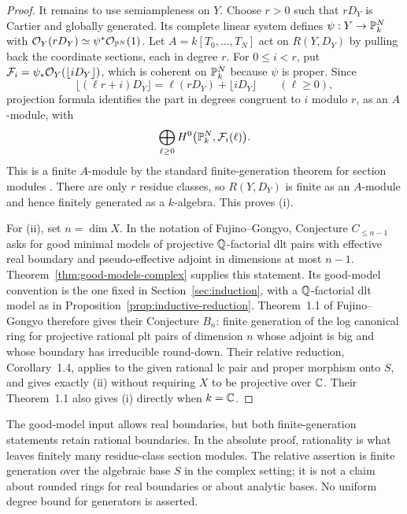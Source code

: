 \begin{proof}
It remains to use semiampleness on \(Y\). Choose \(r>0\) such that
\(rD_Y\) is Cartier and globally generated. Its complete linear system
defines \(\psi:Y\to\mathbb{P}^N_k\) with
\(\mathcal{O}_Y(rD_Y)\simeq\psi^*\mathcal{O}_{\mathbb{P}^N}(1)\). Let
\(A=k[T_0,\ldots,T_N]\) act on \(R(Y,D_Y)\) by pulling back the coordinate
sections, each in degree \(r\). For \(0\leq i<r\), put
\(\mathcal F_i=\psi_*\mathcal{O}_Y(\lfloor iD_Y\rfloor)\), which is coherent on
\(\mathbb{P}^N_k\) because \(\psi\) is proper. Since
\[
 \lfloor(\ell r+i)D_Y\rfloor
 =\ell(rD_Y)+\lfloor iD_Y\rfloor\qquad(\ell\geq0),
\]
projection formula identifies the part in degrees congruent to \(i\)
modulo \(r\), as an \(A\)-module, with
\[
 \bigoplus_{\ell\geq0}H^0\bigl(\mathbb{P}^N_k,\mathcal F_i(\ell)\bigr).
\]
This is a finite \(A\)-module by the standard finite-generation theorem
for section modules \cite[Lemma~30.14.1(5)]{StacksSectionModules}.
There are only \(r\) residue classes, so \(R(Y,D_Y)\) is finite as an
\(A\)-module and hence finitely generated as a \(k\)-algebra. This proves
\textup{(i)}.

For \textup{(ii)}, set \(n=\dim X\). In the notation of Fujino--Gongyo,
Conjecture \(C_{\leq n-1}\) asks for good minimal models of projective
\(\mathbb{Q}\)-factorial dlt pairs with effective real boundary and pseudo-effective
adjoint in dimensions at most \(n-1\). Theorem~\ref{thm:good-models-complex}
supplies this statement. Its good-model convention is the one fixed in
Section~\ref{sec:induction}, with a \(\mathbb{Q}\)-factorial dlt model as in
Proposition~\ref{prop:inductive-reduction}. Theorem~1.1 of
Fujino--Gongyo \cite{FujinoGongyoRings2014} therefore gives their
Conjecture \(B_n\): finite generation of the log canonical ring for
projective rational plt pairs of dimension \(n\) whose adjoint is big
and whose boundary has irreducible round-down. Their relative reduction,
Corollary~1.4, applies to the given rational lc pair and proper morphism
onto \(S\), and gives exactly \textup{(ii)} without requiring \(X\) to
be projective over \(\mathbb{C}\).
Their Theorem~1.1 also gives \textup{(i)} directly when \(k=\mathbb{C}\).
\end{proof}

The good-model input allows real boundaries, but both finite-generation
statements retain rational boundaries. In the absolute proof, rationality
is what leaves finitely many residue-class section modules. The relative
assertion is finite generation over the algebraic base \(S\) in the complex
setting; it is not a claim about rounded rings for real boundaries or about
analytic bases. No uniform degree bound for generators is asserted.
